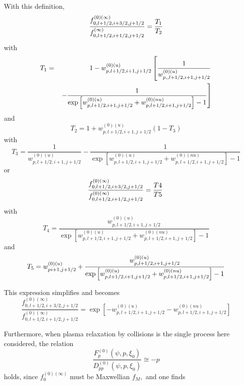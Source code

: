 With this definition,
\begin{equation}
\frac{f_{0,l+1/2,i+3/2,j+1/2}^{\left( 0\right) (\infty )}}{%
f_{0,l+1/2,i+1/2,j+1/2}^{(\infty )}}=\frac{T_{1}}{T_{2}}
\end{equation}
with
\begin{eqnarray}
T_{1} &=&1-w_{p,l+1/2,i+1,j+1/2}^{\left( 0\right) (u)}\left[ \frac{1}{%
w_{p,,l+1/2,i+1,j+1/2}^{\left( 0\right) (u)}}\right.  \nonumber \\
&&\left. -\frac{1}{\exp \left[ w_{p,l+1/2,i+1,j+1/2}^{\left( 0\right)
(u)}+w_{p,l+1/2,i+1,j+1/2}^{\left( 0\right) (nu)}\right] -1}\right]
\end{eqnarray}
and
\begin{equation}
T_{2}=1+w_{p,l+1/2,i+1,j+1/2}^{\left( 0\right) (u)}\left( 1-T_{3}\right)
\end{equation}
with
\begin{equation}
T_{3}=\frac{1}{w_{p,l+1/2,i+1,j+1/2}^{\left( 0\right) (u)}}-\frac{1}{\exp
\left[ w_{p,l+1/2,i+1,j+1/2}^{\left( 0\right)
(u)}+w_{p,l+1/2,i+1,j+1/2}^{\left( 0\right) (nu)}\right] -1}
\end{equation}
or
\begin{equation}
\frac{f_{0,l+1/2,i+3/2,j+1/2}^{\left( 0\right) (\infty )}}{%
f_{0,l+1/2,i+1/2,j+1/2}^{\left( 0\right) (\infty )}}=\frac{T4}{T5}\frac {} {}
\end{equation}
with
\begin{equation}
T_{4}=\frac{w_{p,l+1/2,i+1,j+1/2}^{\left( 0\right) (u)}}{\exp \left[
w_{p,l+1/2,i+1,j+1/2}^{\left( 0\right) (u)}+w_{p,l+1/2,i+1,j+1/2}^{\left(
0\right) (nu)}\right] -1}
\end{equation}
and
\begin{equation}
T_{5}=w_{pi+1,j+1/2}^{\left( 0\right) (u)}+\frac{w_{p,l+1/2,i+1,j+1/2}^{%
\left( 0\right) (u)}}{\exp \left[ w_{p,l+1/2,i+1,j+1/2}^{\left( 0\right)
(u)}+w_{p,l+1/2,i+1,j+1/2}^{\left( 0\right) (nu)}\right] -1}
\end{equation}

This expression simplifies and becomes
\begin{equation}
\frac{f_{0,l+1/2,i+3/2,j+1/2}^{\left( 0\right) (\infty )}}{
f_{0,l+1/2,i+1/2,j+1/2}^{\left( 0\right) (\infty )}}=\exp \left[
-w_{p,l+1/2,i+1,j+1/2}^{\left( 0\right) (u)}-w_{p,l+1/2,i+1,j+1/2}^{\left(
0\right) (nu)}\right]
\end{equation}

Furthermore, when plasma relaxation by collisions is the single process here
considered, the relation
\begin{equation}
\frac{F_{p}^{\left( 0\right) }\left( \psi ,p,\xi _{0}\right) }{
D_{pp}^{\left( 0\right) }\left( \psi ,p,\xi _{0}\right) }\cong -p
\end{equation}
holds, since $f_{0}^{\left( 0\right) (\infty )}$ must be Maxwellian $f_{M},$
and one finds

